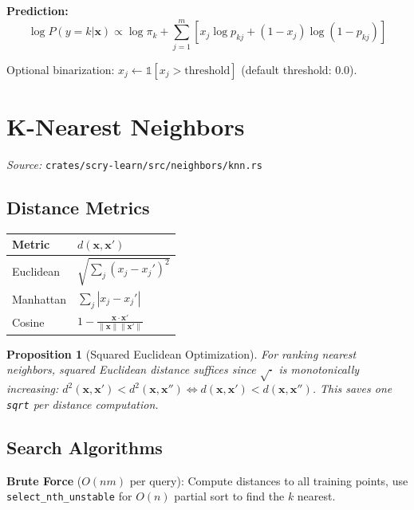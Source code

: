 \documentclass[11pt,a4paper]{article}
\newtheorem{proposition}[theorem]{Proposition}
\theoremstyle{definition}
\theoremstyle{remark}
\begin{document}
\textbf{Prediction:}
\begin{equation}
\log P(y=k|\mathbf{x}) \propto \log\pi_k + \sum_{j=1}^m\left[x_j\log p_{kj} + (1-x_j)\log(1-p_{kj})\right]
\end{equation}

Optional binarization: $x_j \leftarrow \mathbb{1}[x_j > \text{threshold}]$ (default threshold: 0.0).


\section{K-Nearest Neighbors}

\noindent\textit{Source:} \texttt{crates/scry-learn/src/neighbors/knn.rs}

\subsection{Distance Metrics}

\begin{center}
\begin{tabular}{ll}
\toprule
Metric & $d(\mathbf{x}, \mathbf{x}')$ \\
\midrule
Euclidean & $\sqrt{\sum_j (x_j - x_j')^2}$ \\
Manhattan & $\sum_j |x_j - x_j'|$ \\
Cosine & $1 - \frac{\mathbf{x} \cdot \mathbf{x}'}{\|\mathbf{x}\|\|\mathbf{x}'\|}$ \\
\bottomrule
\end{tabular}
\end{center}

\begin{proposition}[Squared Euclidean Optimization]
For ranking nearest neighbors, squared Euclidean distance suffices since $\sqrt{\cdot}$ is monotonically increasing:
$d^2(\mathbf{x}, \mathbf{x}') < d^2(\mathbf{x}, \mathbf{x}'') \Leftrightarrow d(\mathbf{x}, \mathbf{x}') < d(\mathbf{x}, \mathbf{x}'')$.
This saves one \texttt{sqrt} per distance computation.
\end{proposition}

\subsection{Search Algorithms}

\textbf{Brute Force} ($O(nm)$ per query): Compute distances to all training points, use \texttt{select\_nth\_unstable} for $O(n)$ partial sort to find the $k$ nearest.
\end{document}
